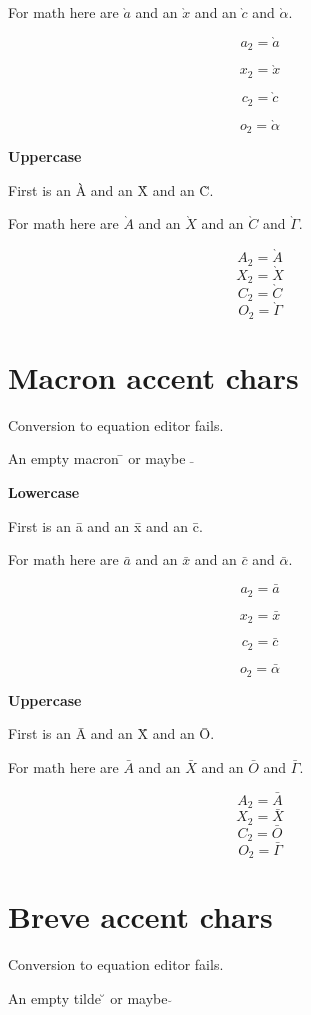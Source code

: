 \documentclass{article}
\begin{document}
For math here are $\grave{a}$ and an $\grave{x}$ and an $\grave{c}$ and $\grave{\alpha}$.

$$a_2=\grave{a}$$

$$x_2=\grave{x}$$

$$c_2=\grave{c}$$

$$o_2=\grave{\alpha}$$

\textbf{Uppercase}

First is an \`{A} and an \`{X} and an \`{C}.

For math here are $\grave{A}$ and an $\grave{X}$ and an $\grave{C}$ and $\grave{\Gamma}$.

$$A_2=\grave{A}$$
$$X_2=\grave{X}$$
$$C_2=\grave{C}$$
$$O_2=\grave{\Gamma}$$




\section{Macron accent chars}

Conversion to equation editor fails.

An empty macron \={} or maybe $\bar{}$

\textbf{Lowercase}

First is an \={a} and an \={x} and an \={c}.

For math here are $\bar{a}$ and an $\bar{x}$ and an $\bar{c}$ and $\bar{\alpha}$.

$$a_2=\bar{a}$$

$$x_2=\bar{x}$$

$$c_2=\bar{c}$$

$$o_2=\bar{\alpha}$$

\textbf{Uppercase}

First is an \={A} and an \={X} and an \={O}.

For math here are $\bar{A}$ and an $\bar{X}$ and an $\bar{O}$ and $\bar{\Gamma}$.

$$A_2=\bar{A}$$
$$X_2=\bar{X}$$
$$C_2=\bar{O}$$
$$O_2=\bar{\Gamma}$$




\section{Breve accent chars}

Conversion to equation editor fails.

An empty tilde \u{} or maybe $\breve{}$
\end{document}

